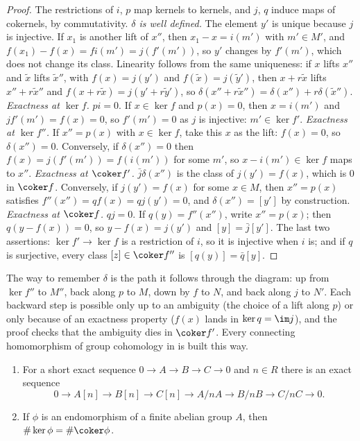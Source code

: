 \begin{proof}
The restrictions of $i$, $p$ map kernels to kernels, and $j$, $q$ induce maps of cokernels, by commutativity.
\emph{$\delta$ is well defined.} The element $y'$ is unique because $j$ is injective. If $x_1$ is another lift of $x''$, then
$x_1-x=i(m')$ with $m'\in M'$, and $f(x_1)-f(x)=fi(m')=j(f'(m'))$, so $y'$ changes by $f'(m')$, which does not change its
class. Linearity follows from the same uniqueness: if $x$ lifts $x''$ and $\tilde x$ lifts $\tilde x''$, with $f(x)=j(y')$ and
$f(\tilde x)=j(\tilde y')$, then $x+r\tilde x$ lifts $x''+r\tilde x''$ and $f(x+r\tilde x)=j(y'+r\tilde y')$, so
$\delta(x''+r\tilde x'')=\delta(x'')+r\delta(\tilde x'')$.
\emph{Exactness at $\ker f$.} $pi=0$. If $x\in\ker f$ and $p(x)=0$, then $x=i(m')$ and $jf'(m')=f(x)=0$, so $f'(m')=0$ as $j$ is
injective: $m'\in\ker f'$.
\emph{Exactness at $\ker f''$.} If $x''=p(x)$ with $x\in\ker f$, take this $x$ as the lift: $f(x)=0$, so $\delta(x'')=0$.
Conversely, if $\delta(x'')=0$ then $f(x)=j(f'(m'))=f(i(m'))$ for some $m'$, so $x-i(m')\in\ker f$ maps to $x''$.
\emph{Exactness at $\coker f'$.} $\bar j\delta(x'')$ is the class of $j(y')=f(x)$, which is $0$ in $\coker f$. Conversely, if
$j(y')=f(x)$ for some $x\in M$, then $x''=p(x)$ satisfies $f''(x'')=qf(x)=qj(y')=0$, and $\delta(x'')=[y']$ by construction.
\emph{Exactness at $\coker f$.} $qj=0$. If $q(y)=f''(x'')$, write $x''=p(x)$; then $q(y-f(x))=0$, so $y-f(x)=j(y')$ and
$[y]=\bar j[y']$.
The last two assertions: $\ker f'\to\ker f$ is a restriction of $i$, so it is injective when $i$ is; and if $q$ is surjective, every class
$[z]\in\coker f''$ is $[q(y)]=\bar q[y]$.
\end{proof}

The way to remember $\delta$ is the path it follows through the diagram: up from $\ker f''$ to $M''$, back along $p$ to $M$, down by $f$
to $N$, and back along $j$ to $N'$. Each backward step is possible only up to an ambiguity (the choice of a lift along $p$) or only
because of an exactness property ($f(x)$ lands in $\ker q=\im j$), and the proof checks that the ambiguity dies in $\coker f'$. Every
connecting homomorphism of group cohomology in  is built this way.

\begin{corollary}\label{cor:modules:snake}
\begin{enumerate}[label=(\alph*)]
\item For a short exact sequence $0\to A\to B\to C\to0$ and $n\in R$ there is an exact sequence
\[
0\to A[n]\to B[n]\to C[n]\to A/nA\to B/nB\to C/nC\to0 .
\]
\item If $\phi$ is an endomorphism of a finite abelian group $A$, then $\#\ker\phi=\#\coker\phi$.
\end{enumerate}
\end{corollary}

